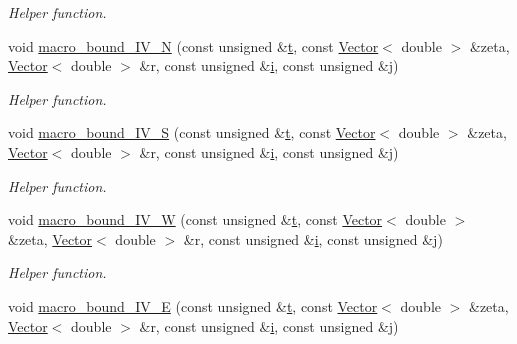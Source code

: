 \begin{DoxyCompactItemize}
\begin{DoxyCompactList}\small\item\em Helper function. \end{DoxyCompactList}\item 
void \hyperlink{classoomph_1_1ChannelWithLeafletDomain_ae8d9410d270e27677cb89c5dfe9cc136}{macro\+\_\+bound\+\_\+\+I\+V\+\_\+N} (const unsigned \&\hyperlink{cfortran_8h_af6f0bd3dc13317f895c91323c25c2b8f}{t}, const \hyperlink{classoomph_1_1Vector}{Vector}$<$ double $>$ \&zeta, \hyperlink{classoomph_1_1Vector}{Vector}$<$ double $>$ \&r, const unsigned \&\hyperlink{cfortran_8h_adb50e893b86b3e55e751a42eab3cba82}{i}, const unsigned \&j)
\begin{DoxyCompactList}\small\item\em Helper function. \end{DoxyCompactList}\item 
void \hyperlink{classoomph_1_1ChannelWithLeafletDomain_a038eba8447f4d1643cd44642294bf43f}{macro\+\_\+bound\+\_\+\+I\+V\+\_\+S} (const unsigned \&\hyperlink{cfortran_8h_af6f0bd3dc13317f895c91323c25c2b8f}{t}, const \hyperlink{classoomph_1_1Vector}{Vector}$<$ double $>$ \&zeta, \hyperlink{classoomph_1_1Vector}{Vector}$<$ double $>$ \&r, const unsigned \&\hyperlink{cfortran_8h_adb50e893b86b3e55e751a42eab3cba82}{i}, const unsigned \&j)
\begin{DoxyCompactList}\small\item\em Helper function. \end{DoxyCompactList}\item 
void \hyperlink{classoomph_1_1ChannelWithLeafletDomain_ab9da487d185f947a30e03b43d0fc0c9b}{macro\+\_\+bound\+\_\+\+I\+V\+\_\+W} (const unsigned \&\hyperlink{cfortran_8h_af6f0bd3dc13317f895c91323c25c2b8f}{t}, const \hyperlink{classoomph_1_1Vector}{Vector}$<$ double $>$ \&zeta, \hyperlink{classoomph_1_1Vector}{Vector}$<$ double $>$ \&r, const unsigned \&\hyperlink{cfortran_8h_adb50e893b86b3e55e751a42eab3cba82}{i}, const unsigned \&j)
\begin{DoxyCompactList}\small\item\em Helper function. \end{DoxyCompactList}\item 
void \hyperlink{classoomph_1_1ChannelWithLeafletDomain_a16c8d718f5da2e6d9d73fe0455bacc0c}{macro\+\_\+bound\+\_\+\+I\+V\+\_\+E} (const unsigned \&\hyperlink{cfortran_8h_af6f0bd3dc13317f895c91323c25c2b8f}{t}, const \hyperlink{classoomph_1_1Vector}{Vector}$<$ double $>$ \&zeta, \hyperlink{classoomph_1_1Vector}{Vector}$<$ double $>$ \&r, const unsigned \&\hyperlink{cfortran_8h_adb50e893b86b3e55e751a42eab3cba82}{i}, const unsigned \&j)

\end{DoxyCompactItemize}

